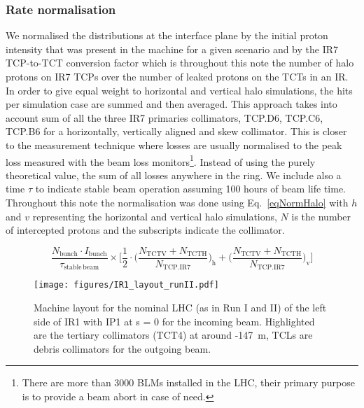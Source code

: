 \subsubsection{Rate normalisation}


We normalised the distributions at the interface plane by the initial proton intensity that was present in the machine for a given scenario and by the IR7 TCP-to-TCT conversion factor which is throughout this note the number of halo protons on IR7 TCPs over the number of leaked protons on the TCTs in an IR. In order to give equal weight to horizontal and vertical halo simulations, the hits per simulation case are summed and then averaged. This approach takes into account sum of all the three IR7 primaries collimators, TCP.D6, TCP.C6, TCP.B6 for a horizontally, vertically aligned and skew collimator. This is closer to the measurement technique where losses are usually normalised to the peak loss measured with the beam loss monitors\footnote{There are more than 3000 BLMs installed in the LHC, their primary purpose is to provide a beam abort in case of need.}. Instead of using the purely theoretical value, the sum of all losses anywhere in the ring. We include also a time $\tau$ to indicate stable beam operation assuming 100 hours of beam life time. Throughout this note the normalisation was done using Eq.~\ref{eqNormHalo} with $h$ and $v$ representing the horizontal and vertical halo simulations, $N$ is the number of intercepted protons and the subscripts indicate the collimator. 

\begin{equation} \label{eqNormHalo}
\frac{N_{\mathrm{bunch}} \cdot I_{\mathrm{bunch}}}{\tau_{\mathrm{stable \, beam}}} \times \Bigg[ \frac{1}{2} \cdot \Big( \frac{N_{\mathrm{TCTV}} + N_{\mathrm{TCTH}}}{N_{\mathrm{TCP.IR7}}}\Big)_{\mathrm{h}} + \Big( \frac{N_{\mathrm{TCTV}} + N_{\mathrm{TCTH}}}{N_{\mathrm{TCP.IR7}}} \Big)_{\mathrm{v}}  \Bigg]
\end{equation}


\begin{figure}%
\begin{center}
\texttt{[image: figures/IR1\_layout\_runII.pdf]}
\end{center}
\vspace{-0.6cm}
 \caption{Machine layout for the nominal LHC (as in Run I and II) of the left side of IR1 with IP1 at s = 0 for the incoming beam. Highlighted are the tertiary collimators (TCT4) at around -147~m, TCLs are debris collimators for the outgoing beam.
  \label{nominalLHC_layout}}
\end{figure}


